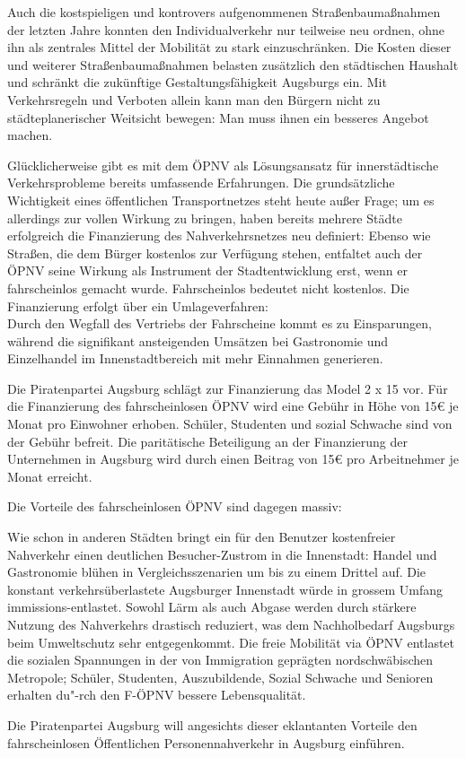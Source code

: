   Auch die kostspieligen und kontrovers aufgenommenen Straßenbaumaßnahmen 
  der letzten Jahre konnten den Individualverkehr nur teilweise neu ordnen, 
  ohne ihn als zentrales Mittel der Mobilität zu stark einzuschränken. Die 
  Kosten dieser und weiterer Straßenbaumaßnahmen belasten zusätzlich den 
  städtischen Haushalt und schränkt die zukünftige Gestaltungsfähigkeit 
  Augsburgs ein. Mit Verkehrsregeln und Verboten allein kann man den Bürgern 
  nicht zu städteplanerischer Weitsicht bewegen: Man muss ihnen ein besseres 
  Angebot machen.
  
  Glücklicherweise gibt es mit dem ÖPNV als Lösungsansatz für innerstädtische 
  Verkehrsprobleme bereits umfassende Erfahrungen. Die grundsätzliche 
  Wichtigkeit eines öffentlichen Transportnetzes steht heute außer Frage; um 
  es allerdings zur vollen Wirkung zu bringen, haben bereits mehrere Städte 
  erfolgreich die Finanzierung des Nahverkehrsnetzes neu definiert: Ebenso wie 
  Straßen, die dem Bürger kostenlos zur Verfügung stehen, entfaltet auch der 
  ÖPNV seine Wirkung als Instrument der Stadtentwicklung erst, wenn er 
  fahrscheinlos gemacht wurde. Fahrscheinlos bedeutet nicht kostenlos. Die 
  Finanzierung erfolgt über ein Umlageverfahren:\\ Durch den Wegfall des 
  Vertriebs der Fahrscheine kommt es zu Einsparungen, während die signifikant 
  ansteigenden Umsätzen bei Gastronomie und Einzelhandel im Innenstadtbereich 
  mit mehr Einnahmen generieren.
  
  Die Piratenpartei Augsburg schlägt zur Finanzierung das Model 2 x 15 vor. 
  Für die Finanzierung des fahrscheinlosen ÖPNV wird eine Gebühr in Höhe von 
  15€ je Monat pro Einwohner erhoben. Schüler, Studenten und sozial Schwache 
  sind von der Gebühr befreit. Die paritätische Beteiligung an der 
  Finanzierung der Unternehmen in Augsburg wird durch einen Beitrag von 15€ 
  pro Arbeitnehmer je Monat erreicht.
  
  Die Vorteile des fahrscheinlosen ÖPNV sind dagegen massiv:
  
  Wie schon in anderen Städten bringt ein für den Benutzer kostenfreier 
  Nahverkehr einen deutlichen Besucher-Zustrom in die Innenstadt: Handel und 
  Gastronomie blühen in Vergleichsszenarien um bis zu einem Drittel auf. Die 
  konstant verkehrsüberlastete Augsburger Innenstadt würde in grossem Umfang 
  immissions-entlastet. Sowohl Lärm als auch Abgase werden durch stärkere 
  Nutzung des Nahverkehrs drastisch reduziert, was dem Nachholbedarf Augsburgs 
  beim Umweltschutz sehr entgegenkommt. Die freie Mobilität via ÖPNV entlastet 
  die sozialen Spannungen in der von Immigration geprägten nordschwäbischen 
  Metropole; Schüler, Studenten, Auszubildende, Sozial Schwache und Senioren 
  erhalten du"-rch den F-ÖPNV bessere Lebensqualität.
  
  Die Piratenpartei Augsburg will angesichts dieser eklantanten Vorteile den 
  fahrscheinlosen Öffentlichen Personennahverkehr in Augsburg einführen.
